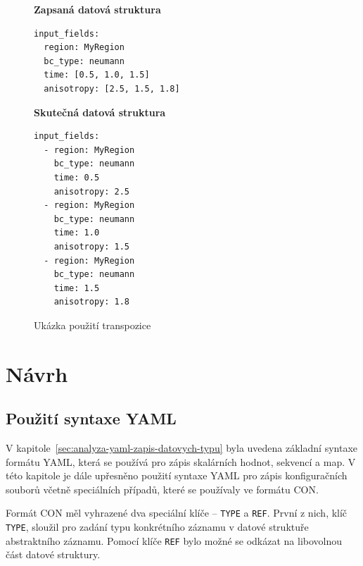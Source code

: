 \documentclass[FM,bw,DP]{tulthesis}
\begin{document}
\begin{figure}[ht]
\singlespacing
\begin{minipage}[t]{0.5\linewidth}
\vspace{0pt}
\textbf{Zapsaná datová struktura}\\
\vspace{-5pt}
\begin{lstlisting}
input_fields: 
  region: MyRegion
  bc_type: neumann
  time: [0.5, 1.0, 1.5]
  anisotropy: [2.5, 1.5, 1.8]
\end{lstlisting}
\end{minipage}
\hfill
\begin{minipage}[t]{0.45\linewidth}
\vspace{0pt}
\textbf{Skutečná datová struktura}\\
\vspace{-5pt}
\begin{lstlisting}
input_fields: 
  - region: MyRegion
    bc_type: neumann
    time: 0.5
    anisotropy: 2.5
  - region: MyRegion
    bc_type: neumann
    time: 1.0
    anisotropy: 1.5
  - region: MyRegion
    bc_type: neumann
    time: 1.5
    anisotropy: 1.8
\end{lstlisting}
\vspace*{-20pt}
\end{minipage}
\onehalfspacing
\caption{Ukázka použití transpozice}
\label{img:transposition_code_example}
\end{figure}

\chapter{Návrh}


\section{Použití syntaxe YAML}

V kapitole~\ref{sec:analyza-yaml-zapis-datovych-typu} byla uvedena základní syntaxe formátu YAML, která se používá pro zápis skalárních hodnot, sekvencí a map. V této kapitole je dále upřesněno použití syntaxe YAML pro zápis konfiguračních souborů včetně speciálních případů, které se používaly ve formátu CON. 

Formát CON měl vyhrazené dva speciální klíče -- \texttt{TYPE} a \texttt{REF}. První z nich, klíč \texttt{TYPE}, sloužil pro zadání typu konkrétního záznamu v datové struktuře abstraktního záznamu. Pomocí klíče \texttt{REF} bylo možné se odkázat na libovolnou část datové struktury.
\end{document}
